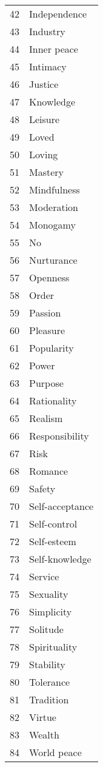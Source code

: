 \documentclass[11pt,a4paper,twocolumn]{article}
\begin{document}
\begin{supertabular}{cl}
    42 & Independence\\
    43 & Industry\\
    44 & Inner peace\\
    45 & Intimacy\\
    46 & Justice\\
    47 & Knowledge\\
    48 & Leisure\\
    49 & Loved\\
    50 & Loving\\
    51 & Mastery\\
    52 & Mindfulness\\
    53 & Moderation\\
    54 & Monogamy\\
    55 & No\\
    56 & Nurturance\\
    57 & Openness\\
    58 & Order\\
    59 & Passion\\
    60 & Pleasure\\
    61 & Popularity\\
    62 & Power\\
    63 & Purpose\\
    64 & Rationality\\
    65 & Realism\\
    66 & Responsibility\\
    67 & Risk\\
    68 & Romance\\
    69 & Safety\\
    70 & Self-acceptance\\
    71 & Self-control\\
    72 & Self-esteem\\
    73 & Self-knowledge\\
    74 & Service\\
    75 & Sexuality\\
    76 & Simplicity\\
    77 & Solitude\\
    78 & Spirituality\\
    79 & Stability\\
    80 & Tolerance\\
    81 & Tradition\\
    82 & Virtue\\
    83 & Wealth\\
    84 & World peace\\
\end{supertabular}
\end{document}
